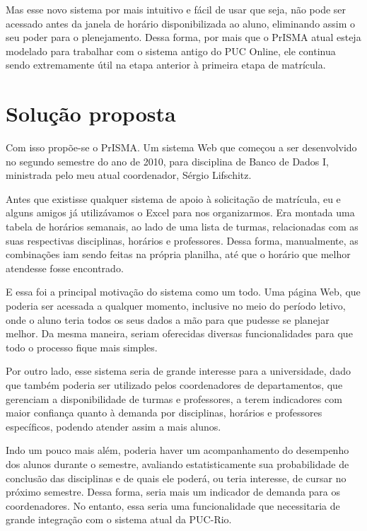 \documentclass[graduacao,brazil]{ThesisPUC}
\begin{document}
Mas esse novo sistema por mais intuitivo e fácil de usar que seja, não pode ser acessado antes da janela de horário disponibilizada ao aluno, eliminando assim o seu poder para o plenejamento. Dessa forma, por mais que o PrISMA atual esteja modelado para trabalhar com o sistema antigo do PUC Online, ele continua sendo extremamente útil na etapa anterior à primeira etapa de matrícula.



\chapter{Solução proposta}

Com isso propõe-se o PrISMA. Um sistema Web que começou a ser desenvolvido no segundo semestre do ano de 2010, para disciplina de Banco de Dados I, ministrada pelo meu atual coordenador, Sérgio Lifschitz.

Antes que existisse qualquer sistema de apoio à solicitação de matrícula, eu e alguns amigos já utilizávamos o Excel para nos organizarmos. Era montada uma tabela de horários semanais, ao lado de uma lista de turmas, relacionadas com as suas respectivas disciplinas, horários e professores. Dessa forma, manualmente, as combinações iam sendo feitas na própria planilha, até que o horário que melhor atendesse fosse encontrado.

E essa foi a principal motivação do sistema como um todo. Uma página Web, que poderia ser acessada a qualquer momento, inclusive no meio do período letivo, onde o aluno teria todos os seus dados a mão para que pudesse se planejar melhor. Da mesma maneira, seriam oferecidas diversas funcionalidades para que todo o processo fique mais simples.

Por outro lado, esse sistema seria de grande interesse para a universidade, dado que também poderia ser utilizado pelos coordenadores de departamentos, que gerenciam a disponibilidade de turmas e professores, a terem indicadores com maior confiança quanto à demanda por disciplinas, horários e professores específicos, podendo atender assim a mais alunos.

Indo um pouco mais além, poderia haver um acompanhamento do desempenho dos alunos durante o semestre, avaliando estatisticamente sua probabilidade de conclusão das disciplinas e de quais ele poderá, ou teria interesse, de cursar no próximo semestre. Dessa forma, seria mais um indicador de demanda para os coordenadores. No entanto, essa seria uma funcionalidade que necessitaria de grande integração com o sistema atual da PUC-Rio.
\end{document}
